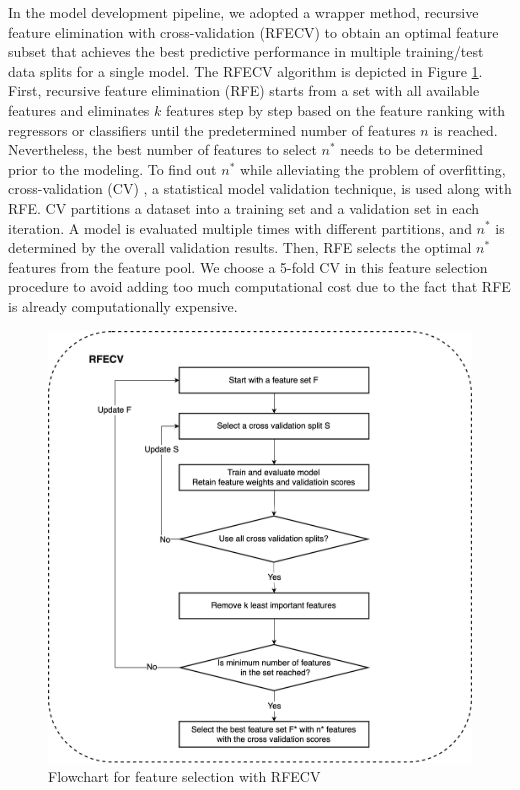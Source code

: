 In the model development pipeline, we adopted a wrapper method, recursive feature elimination \cite{feature-selection-GUYON2003} with cross-validation (RFECV) to obtain an optimal feature subset that achieves the best predictive performance in multiple training/test data splits for a single model. The RFECV algorithm is depicted in Figure \ref{fig: rfecv}. First, recursive feature elimination (RFE) starts from a set with all available features and eliminates $k$ features step by step based on the feature ranking with regressors or classifiers until the predetermined number of features $n$ is reached. Nevertheless, the best number of features to select $n^*$ needs to be determined prior to the modeling. To find out $n^*$ while alleviating the problem of overfitting, cross-validation (CV) \cite{cv-kohavi1995study}, a statistical model validation technique, is used along with RFE. CV partitions a dataset into a training set and a validation set in each iteration. A model is evaluated multiple times with different partitions, and $n^*$ is determined by the overall validation results. Then, RFE selects the optimal $n^*$ features from the feature pool. We choose a 5-fold CV in this feature selection procedure to avoid adding too much computational cost due to the fact that RFE is already computationally expensive.

\begin{figure}[tb]
    \centering
    \includegraphics[width=0.9\linewidth]{fig/rfecv.png}
    \caption{Flowchart for feature selection with RFECV}
    \label{fig: rfecv}
\end{figure}

